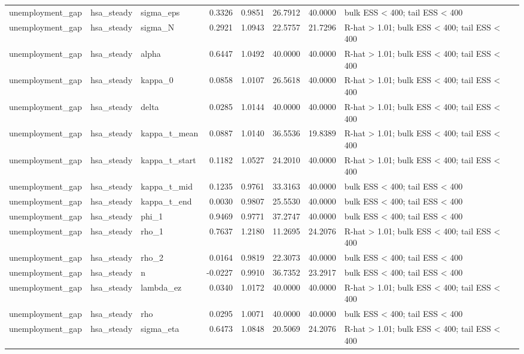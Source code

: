 \begin{tabular}{lllrrrrl}
unemployment\_gap & hsa\_steady & sigma\_eps & 0.3326 & 0.9851 & 26.7912 & 40.0000 & bulk ESS < 400; tail ESS < 400 \\
unemployment\_gap & hsa\_steady & sigma\_N & 0.2921 & 1.0943 & 22.5757 & 21.7296 & R-hat > 1.01; bulk ESS < 400; tail ESS < 400 \\
unemployment\_gap & hsa\_steady & alpha & 0.6447 & 1.0492 & 40.0000 & 40.0000 & R-hat > 1.01; bulk ESS < 400; tail ESS < 400 \\
unemployment\_gap & hsa\_steady & kappa\_0 & 0.0858 & 1.0107 & 26.5618 & 40.0000 & R-hat > 1.01; bulk ESS < 400; tail ESS < 400 \\
unemployment\_gap & hsa\_steady & delta & 0.0285 & 1.0144 & 40.0000 & 40.0000 & R-hat > 1.01; bulk ESS < 400; tail ESS < 400 \\
unemployment\_gap & hsa\_steady & kappa\_t\_mean & 0.0887 & 1.0140 & 36.5536 & 19.8389 & R-hat > 1.01; bulk ESS < 400; tail ESS < 400 \\
unemployment\_gap & hsa\_steady & kappa\_t\_start & 0.1182 & 1.0527 & 24.2010 & 40.0000 & R-hat > 1.01; bulk ESS < 400; tail ESS < 400 \\
unemployment\_gap & hsa\_steady & kappa\_t\_mid & 0.1235 & 0.9761 & 33.3163 & 40.0000 & bulk ESS < 400; tail ESS < 400 \\
unemployment\_gap & hsa\_steady & kappa\_t\_end & 0.0030 & 0.9807 & 25.5530 & 40.0000 & bulk ESS < 400; tail ESS < 400 \\
unemployment\_gap & hsa\_steady & phi\_1 & 0.9469 & 0.9771 & 37.2747 & 40.0000 & bulk ESS < 400; tail ESS < 400 \\
unemployment\_gap & hsa\_steady & rho\_1 & 0.7637 & 1.2180 & 11.2695 & 24.2076 & R-hat > 1.01; bulk ESS < 400; tail ESS < 400 \\
unemployment\_gap & hsa\_steady & rho\_2 & 0.0164 & 0.9819 & 22.3073 & 40.0000 & bulk ESS < 400; tail ESS < 400 \\
unemployment\_gap & hsa\_steady & n & -0.0227 & 0.9910 & 36.7352 & 23.2917 & bulk ESS < 400; tail ESS < 400 \\
unemployment\_gap & hsa\_steady & lambda\_ez & 0.0340 & 1.0172 & 40.0000 & 40.0000 & R-hat > 1.01; bulk ESS < 400; tail ESS < 400 \\
unemployment\_gap & hsa\_steady & rho & 0.0295 & 1.0071 & 40.0000 & 40.0000 & bulk ESS < 400; tail ESS < 400 \\
unemployment\_gap & hsa\_steady & sigma\_eta & 0.6473 & 1.0848 & 20.5069 & 24.2076 & R-hat > 1.01; bulk ESS < 400; tail ESS < 400 \\

\end{tabular}
